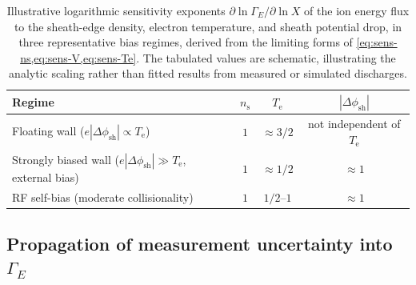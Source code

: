 \begin{table}[htbp]
\centering
\caption{Illustrative logarithmic sensitivity exponents $\partial \ln \Gamma_{E} / \partial \ln X$ of the ion energy flux to the sheath-edge density, electron temperature, and sheath potential drop, in three representative bias regimes, derived from the limiting forms of \cref{eq:sens-ns,eq:sens-V,eq:sens-Te}. The tabulated values are schematic, illustrating the analytic scaling rather than fitted results from measured or simulated discharges.}
\label{tab:sensitivity}
\begin{tabular}{@{}lccc@{}}
\toprule
Regime & $n_{\mathrm{s}}$ & $T_{\mathrm{e}}$ & $|\Delta\phi_{\mathrm{sh}}|$ \\
\midrule
Floating wall ($e|\Delta\phi_{\mathrm{sh}}| \propto T_{\mathrm{e}}$) & $1$ & $\approx 3/2$ & not independent of $T_{\mathrm{e}}$ \\
Strongly biased wall ($e|\Delta\phi_{\mathrm{sh}}| \gg T_{\mathrm{e}}$, external bias) & $1$ & $\approx 1/2$ & $\approx 1$ \\
RF self-bias (moderate collisionality) & $1$ & $1/2$--$1$ & $\approx 1$ \\
\bottomrule
\end{tabular}
\end{table}

\subsection{Propagation of measurement uncertainty into \texorpdfstring{$\Gamma_{E}$}{Gamma\_E}}

